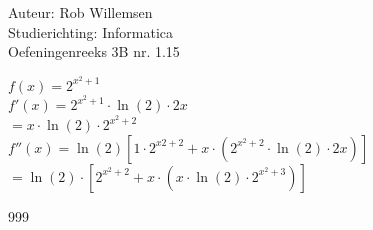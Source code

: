 \documentclass[a4paper]{article}
\begin{document}
\noindent \large Auteur: Rob Willemsen \\
\noindent \large Studierichting: Informatica \\
\noindent \large Oefeningenreeks 3B nr. 1.15 \\

\medskip

\normalsize

$f(x) = 2^{x^2+1}$ \\

$f'(x) = 2^{x^2+1} \cdot \ln(2) \cdot 2x$ \\

$= x \cdot \ln(2) \cdot 2^{x^2+2}$ \\

$f''(x) = \ln(2) \left[1 \cdot 2^{x2+2} + x \cdot \left(2^{x^2+2} \cdot \ln(2) \cdot 2x\right)\right] $ \\

$= \ln(2) \cdot \left[2^{x^2+2} + x \cdot \left(x \cdot \ln(2) \cdot 2^{x^2 + 3}\right)\right]$ \\

\begin{thebibliography}{999}
\end{thebibliography}
\end{document}
